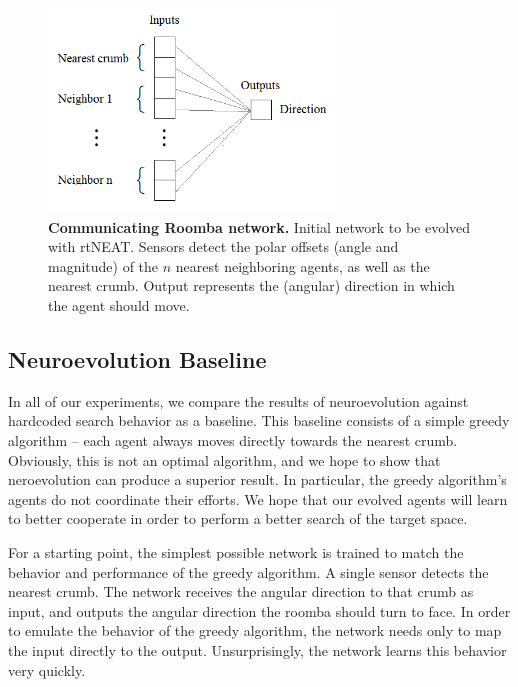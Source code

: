\documentclass[conference]{IEEEtran}
\begin{document}

\begin{figure}[t]
\centering
\includegraphics[width=3.0in]{./figures/neroevolution/comm_network.png}
\caption{\textbf{Communicating Roomba network.} Initial network to be evolved with rtNEAT. Sensors detect the polar offsets (angle and magnitude) of the $n$ nearest neighboring agents, as well as the nearest crumb. Output represents the (angular) direction in which the agent should move.}
\label{neroevolution:communication}
\end{figure}

\subsection{Neuroevolution Baseline}

In all of our experiments, we compare the results of neuroevolution against hardcoded search behavior as a baseline. This baseline consists of a simple greedy algorithm -- each agent always moves directly towards the nearest crumb. Obviously, this is not an optimal algorithm, and we hope to show that neroevolution can produce a superior result. In particular, the greedy algorithm's agents do not coordinate their efforts. We hope that our evolved agents will learn to better cooperate in order to perform a better search of the target space.

For a starting point, the simplest possible network is trained to match the behavior and performance of the greedy algorithm. A single sensor detects the nearest crumb. The network receives the angular direction to that crumb as input, and outputs the angular direction the roomba should turn to face. In order to emulate the behavior of the greedy algorithm, the network needs only to map the input directly to the output. Unsurprisingly, the network learns this behavior very quickly.
\end{document}
